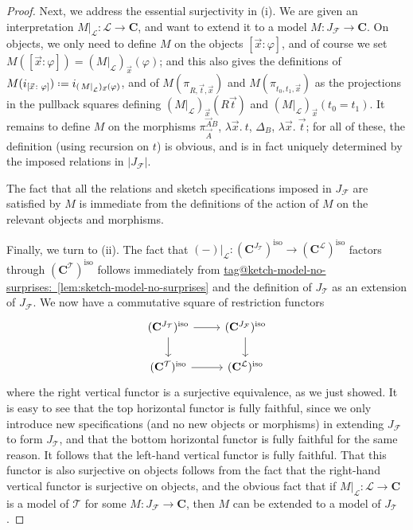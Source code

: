 \documentclass{amsart}
\makeatletter
\newcommand\abs[2][]{#1\lvert{#2}#1\rvert}
\newcommand\bC{\mathbf{C}}
\newcommand\cF{\mathcal{F}}
\newcommand\cL{\mathcal{L}}
\newcommand\cT{\mathcal{T}}
\newcommand\defeq{\mathrel{\vcenter{\baselineskip0.5ex \lineskiplimit0pt \hbox{.}\hbox{.}}} =}
\newcommand\iso{\mathrm{iso}}
\renewcommand\phi{\varphi}
\newcommand\rstr[2]{{\left.#1\right|_{#2}}}
\newcommand\vA{\vek{A}}
\newcommand\vek[1]{{\vec{#1}}}
\newcommand\vt{\vek{t}}
\newcommand\vx{\vek{x}}
\newcommand\tagword[1]{\csname tag@#1\endcsname}
\def\label@tag#1:#2\@nil{#1}
\newcommand\labeltag[1]{\label@tag#1:\@nil}
\newcommand\jref[1]{%
  \texorpdfstring%
    {\hyperref[#1]{\tagword{\labeltag{#1}}~\ref*{#1}}}%
    {\tagword{\labeltag{#1}}~\ref*{#1}}%
}
\theoremstyle{definition}
\theoremstyle{remark}
\theoremstyle{plainwithref}
\makeatother
\begin{document}
\begin{proof}
  Next, we address the essential surjectivity in (i).
  We are given an interpretation \( \rstr{M}{\cL} \colon \cL \to \bC \), and want to extend it to a model \( M \colon J_{\cF} \to \bC \).
  On objects, we only need to define \( M \) on the objects \( [\vx \colon \phi] \), and of course we set \( M([\vx \colon \phi]) = (\rstr{M}{\cL})_{\vx}(\phi) \); and this also gives the definitions of \( M(i_{[\vx \colon \phi]}) \defeq i_{(\rstr{M}{\cL})_{\vx}(\phi)} \), and of \( M(\pi_{R, \vt, \vx}) \) and \( M(\pi_{t_0, t_1, \vx}) \) as the projections in the pullback squares defining \( (\rstr{M}{\cL})_{\vx}(R \vt) \) and \( (\rstr{M}{\cL})_{\vx}(t_0 = t_1) \).
  It remains to define \( M \) on the morphisms \( \pi_{\vA}^{\vA B} \), \( \lambda \vx.\ t \), \( \Delta_B \), \( \lambda \vx.\ \vt \); for all of these, the definition (using recursion on \( t \)) is obvious, and is in fact uniquely determined by the imposed relations in \( \abs{J_\cF} \).

  The fact that all the relations and sketch specifications imposed in \( J_\cF \) are satisfied by \( M \) is immediate from the definitions of the action of \( M \) on the relevant objects and morphisms.

  Finally, we turn to (ii).
  The fact that \( \rstr{(-)}{\cL} \colon (\bC^{J_\cT})^\iso \to (\bC^{\cL})^\iso \) factors through \( (\bC^{\cT})^\iso \) follows immediately from \jref{lem:sketch-model-no-surprises} and the definition of \( J_\cT \) as an extension of \( J_{\cF} \).
  We now have a commutative square of restriction functors
  \[
    \begin{tikzcd}
      (\bC^{J_\cT})^\iso \ar[r, ""] \ar[d, ""'] & (\bC^{J_\cF})^\iso \ar[d, ""] \\
      (\bC^{\cT})^\iso \ar[r, ""] & (\bC^{\cL})^\iso
    \end{tikzcd}
  \]
  where the right vertical functor is a surjective equivalence, as we just showed.
  It is easy to see that the top horizontal functor is fully faithful, since we only introduce new specifications (and no new objects or morphisms) in extending \( J_\cF \) to form \( J_\cT \), and that the bottom horizontal functor is fully faithful for the same reason.
  It follows that the left-hand vertical functor is fully faithful.
  That this functor is also surjective on objects follows from the fact that the right-hand vertical functor is surjective on objects, and the obvious fact that if \( \rstr{M}{\cL} \colon \cL \to \bC \) is a model of \( \cT \) for some \( M \colon J_\cF \to \bC \), then \( M \) can be extended to a model of \( J_\cT \).
\end{proof}
\end{document}
